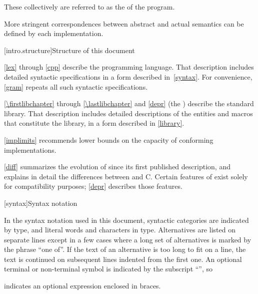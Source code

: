 These collectively are referred to as the
 of the program.
\begin{note}
More stringent correspondences between abstract and actual
semantics can be defined by each implementation.
\end{note}

[intro.structure]{Structure of this document}

\pnum
{}%
%
\ref{lex} through \ref{cpp} describe the \Cpp{} programming
language. That description includes detailed syntactic specifications in
a form described in~\ref{syntax}. For convenience, \ref{gram}
repeats all such syntactic specifications.

\pnum
\ref{\firstlibchapter} through \ref{\lastlibchapter} and \ref{depr}
(the ) describe the \Cpp{} standard library.
That description includes detailed descriptions of the
entities and macros
that constitute the library, in a form described in \ref{library}.

\pnum
\ref{implimits} recommends lower bounds on the capacity of conforming
implementations.

\pnum
\ref{diff} summarizes the evolution of \Cpp{} since its first
published description, and explains in detail the differences between
\Cpp{} and C\@. Certain features of \Cpp{} exist solely for compatibility
purposes; \ref{depr} describes those features.

[syntax]{Syntax notation}

\pnum
{}%
In the syntax notation used in this document, syntactic
categories are indicated by  type, and literal words
and characters in   type. Alternatives are
listed on separate lines except in a few cases where a long set of
alternatives is marked by the phrase ``one of''. If the text of an alternative is too long to fit on a line, the text is continued on subsequent lines indented from the first one.
An optional terminal or non-terminal symbol is indicated by the subscript
``\opt{\relax}'', so
\begin{ncbnf}
\terminal{\{}  \terminal{\}}
\end{ncbnf}
indicates an optional expression enclosed in braces.%

